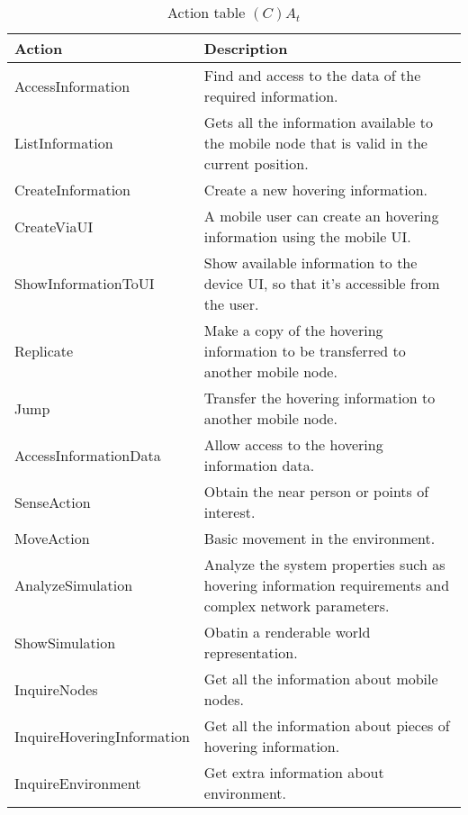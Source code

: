 \begin{table}[H]
	\centering
	\begin{tabular}{|p{5cm}|p{7cm}|}
			\hline
			\textbf{Action} & \textbf{Description} \\
			\hline
			AccessInformation & Find and access to the data of the required
			information. \\
			\hline
			ListInformation & Gets all the information available to the mobile node
			that is valid in the current position.\\
			\hline
			CreateInformation & Create a new hovering information. \\
			\hline
			CreateViaUI & A mobile user can create an hovering information using the
			mobile UI. \\
			\hline
      ShowInformationToUI & Show available information to the device UI, so
      that it's accessible from the user.\\
			\hline
			Replicate & Make a copy of the hovering information to be transferred to
			another mobile node. \\
			\hline
			Jump & Transfer the hovering information to another mobile node. \\
			\hline
			AccessInformationData & Allow access to the hovering information data. \\
			\hline
			SenseAction & Obtain the near person or points of interest. \\
			\hline
			MoveAction & Basic movement in the environment. \\
      \hline
      AnalyzeSimulation & Analyze the system properties such as hovering
      information requirements and complex network parameters. \\
			\hline
			ShowSimulation & Obatin a renderable world representation. \\
			\hline
			InquireNodes & Get all the information about mobile nodes.\\
			\hline
			InquireHoveringInformation & Get all the information about pieces of
			hovering information.\\
			\hline
			InquireEnvironment & Get extra information about environment.\\
			\hline
		\end{tabular}
	\caption{Action table $(C)A_t$}
	\label{tab:cat}
\end{table}

